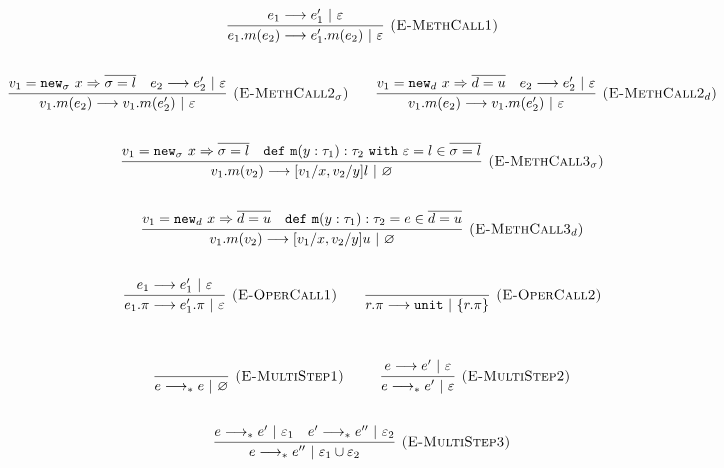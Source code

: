 \documentclass{llncs}
\newcommand{\keywadj}[1]{\mathtt{#1}}
\newcommand{\keyw}[1]{\keywadj{#1}~}
\newcommand{\newd}[0]{
	\keywadj{new}_d~x \Rightarrow \overline{d = u}
}
\newcommand{\newsig}[0]{
	\keywadj{new}_\sigma~x \Rightarrow \overline{\sigma = l}
}
\begin{document}
\[
\begin{array}{c}

	\infer[\textsc{(E-MethCall1)}]
		{e_1.m(e_2) \longrightarrow e_1'.m(e_2)~|~\varepsilon}
		{e_1 \longrightarrow e_1'~|~\varepsilon} \\[5ex]

	\infer[\textsc{(E-MethCall2$_{\sigma}$)}]
		{v_1.m(e_2) \longrightarrow v_1.m(e_2')~|~\varepsilon}
		{v_1 = \newsig & e_2 \longrightarrow e_2'~|~\varepsilon} ~~~~~~
		
	\infer[\textsc{(E-MethCall2$_d$)}]
		{v_1.m(e_2) \longrightarrow v_1.m(e_2')~|~\varepsilon}
		{v_1 = \newd & e_2 \longrightarrow e_2'~|~\varepsilon}\\[5ex]
				
	\infer[\textsc{(E-MethCall3$_{\sigma}$)}]
		{v_1.m(v_2)
			\longrightarrow
		 [v_1/x, v_2/y]l~|~\varnothing}
  		{v_1 = \newsig & \keywadj{def~m}(y: \tau_1) : \tau_2~\keyw{with} \varepsilon = l \in \overline {\sigma = l}} \\[5ex]

	\infer[\textsc{(E-MethCall3$_d$)}]
		{v_1.m(v_2)
			\longrightarrow
		 [v_1/x, v_2/y]u~|~\varnothing}
  		{v_1 = \newd & \keywadj{def~m}(y: \tau_1) : \tau_2 = e \in \overline {d = u}} \\[5ex]

	\infer[\textsc{(E-OperCall1)}]
		{e_1.\pi
			\longrightarrow
		 e_1'.\pi~|~\varepsilon}
		{e_1 \longrightarrow e_1'~|~\varepsilon}
~~~~~~

			\infer[\textsc{(E-OperCall2)}]
		{r.\pi
			\longrightarrow
		 \keywadj{unit}~|~\{r.\pi\}}
		{} \\[5ex]
			
\end{array}
\]
\noindent
{}

\[
\begin{array}{c}

	\infer[\textsc{(E-MultiStep1)}]
	{e \longrightarrow_* e~|~\varnothing}
	{} ~~~~~~~~
	
	\infer[\textsc{(E-MultiStep2)}]
	{e \longrightarrow_* e'~|~\varepsilon}
	{e \longrightarrow e'~|~\varepsilon} \\[5ex]

	\infer[\textsc{(E-MultiStep3)}]
	{e \longrightarrow_* e''~|~\varepsilon_1 \cup \varepsilon_2}
	{e \longrightarrow_* e'~|~\varepsilon_1 & e' \longrightarrow_* e''~|~\varepsilon_2}

\end{array}
\]
\end{document}
